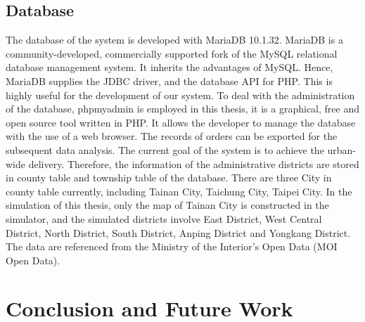 \documentclass[12pt]{ksthesis}
\begin{document}
\begin{thesis}
{\section{Database}
The database of the system is developed with MariaDB 10.1.32. MariaDB is a community-developed, commercially supported fork of the MySQL relational database management system. It inherits the advantages of MySQL. Hence, MariaDB supplies the JDBC driver, and the database API for PHP. This is highly useful for the development of our system. To deal with the administration of the database, phpmyadmin is employed in this thesis, it is a graphical, free and open source tool written in PHP. It allows the developer to manage the database with the use of a web browser. The records of orders can be exported for the subsequent data analysis.
The current goal of the system is to  achieve the urban-wide delivery. Therefore, the information of the administrative districts are stored in county table and township table of the database. There are three City in county table currently, including Tainan City, Taichung City, Taipei City. In the simulation of this thesis, only the map of Tainan City is constructed in the simulator, and the simulated districts involve East District, West Central District, North District, South District, Anping District and Yongkang District. The data are referenced from the Ministry of the Interior’s Open Data (MOI Open Data).














\chapter{Conclusion and Future Work} \label{Chap:Conclusion}

}
\end{thesis}
\end{document}
